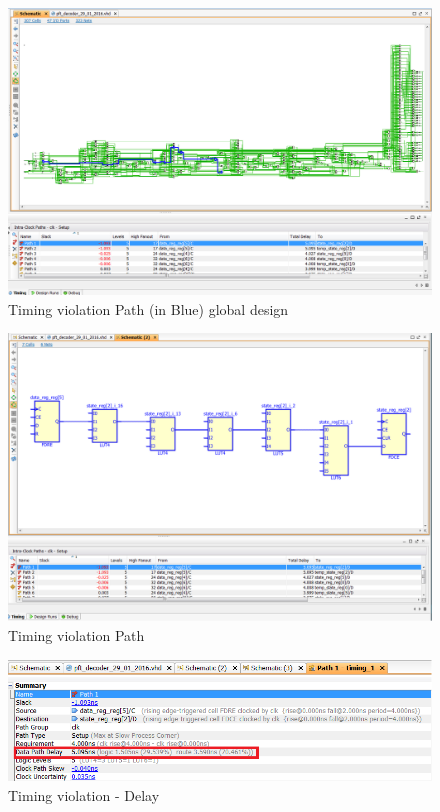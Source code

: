 \documentclass[10pt,a4paper, oneside]{memoir}
\begin{document}
\begin{figure}
\centering
\includegraphics[scale=.6, keepaspectratio]{images/timing_violation_1}
\caption{Timing violation Path (in Blue) global design}
\label{fig:timing_violation_1}
\end{figure}


\begin{figure}
\centering
\includegraphics[scale=.6, keepaspectratio]{images/timing_violation_2}
\caption{Timing violation Path}
\label{fig:timing_violation_2}
\end{figure}


\begin{figure}
\centering
\includegraphics[scale=.8, keepaspectratio]{images/timing_violation_3}
\caption{Timing violation - Delay}
\label{fig:timing_violation_3}
\end{figure}
\end{document}
